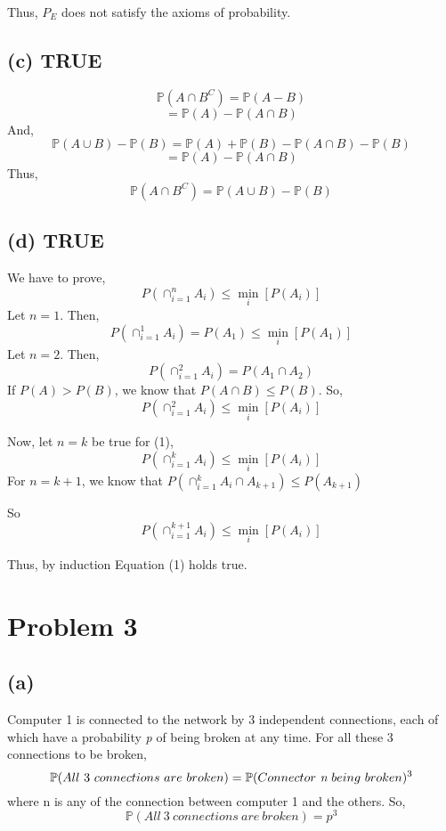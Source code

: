 \documentclass{article}
\begin{document}
			Thus, $P_E$ does not satisfy the axioms of probability. 
 
		\subsection*{(c) TRUE}
			$$ \mathbb{P}(A \cap B^C) = \mathbb{P}(A - B) $$
			$$  = \mathbb{P}(A) - \mathbb{P}(A \cap B) $$
			And,
			$$ \mathbb{P}(A \cup B) - \mathbb{P}(B) = \mathbb{P}(A) + \mathbb{P}(B) - \mathbb{P}(A \cap B) - \mathbb{P}(B) $$
			$$ = \mathbb{P}(A) - \mathbb{P}(A \cap B) $$
			Thus,
			$$ \mathbb{P}(A \cap B^C) = \mathbb{P}(A \cup B) - \mathbb{P}(B) $$
		
		\subsection*{(d) TRUE}
			\setcounter{equation}{0}
			We have to prove,
			\begin{equation}
			P(\cap_{i=1}^{n} A_i) \leq \min_i [P(A_i)]
			\end{equation}
			Let $n=1$. Then,
			$$ P(\cap_{i=1}^{1} A_i) = P(A_1) \leq \min_i [P(A_1)] $$ 
			Let $n=2$. Then,
			$$ P(\cap_{i=1}^{2} A_i) = P(A_1 \cap A_2) $$
			If $P(A)>P(B)$, we know that $P(A \cap B) \leq P(B)$. So,
			$$ P(\cap_{i=1}^{2} A_i)  \leq \min_i [P(A_i)] $$

			Now, let $n=k$ be true for (1),
			\begin{equation}
			P(\cap_{i=1}^{k} A_i) \leq \min_i [P(A_i)]
			\end{equation}
			For $n=k+1$,
			we know that $  P(\cap_{i=1}^{k} A_i \cap A_{k+1}) \leq P(A_{k+1}) $
			
			So
			$$  P(\cap_{i=1}^{k+1} A_i) \leq \min_i [P(A_i)] $$

			Thus, by induction Equation (1) holds true.

	\section*{Problem 3}
		\subsection*{(a)}
			Computer 1 is connected to the network by 3 independent connections, each of which have a probability \emph{p} of being broken at any time. 
			For all these 3 connections to be broken,
			$$ \mathbb{P}(All\ 3\ connections\ are\ broken) = \mathbb{P}(Connector\ \emph{n}\ being\ broken)^3 $$
			where n is any of the connection between computer 1 and the others. So,
			$$ \mathbb{P}(All\ 3\ connections\ are\ broken) = \textit{p}^3 $$
\end{document}
